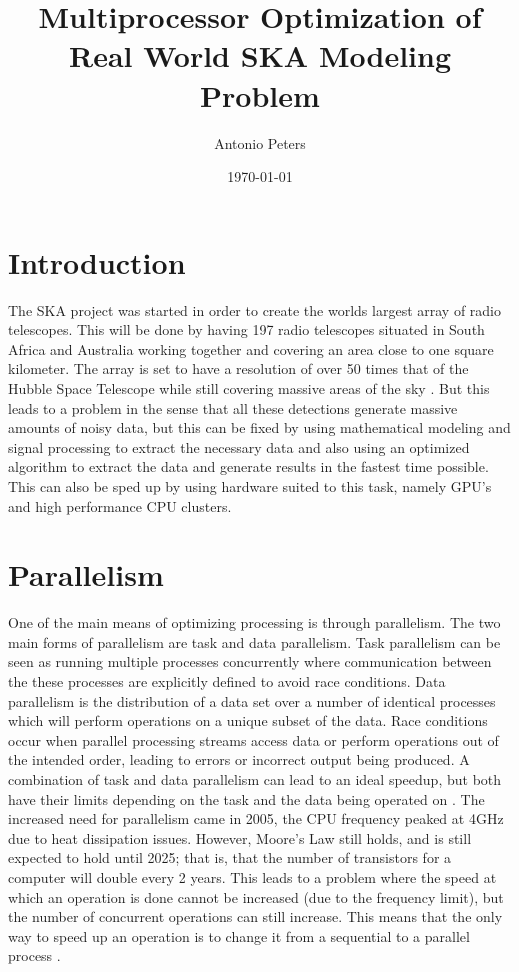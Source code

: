 \documentclass{article}
\title{ Multiprocessor Optimization of Real World SKA Modeling Problem }
\author{Antonio Peters}
\date{\today}
\begin{document}
\maketitle

\section{Introduction}
The SKA project was started in order to create the worlds largest array of radio telescopes. This will be done by having 197 radio telescopes situated in South Africa and Australia working together and covering an area close to one square kilometer. The array is set to have a resolution of over 50 times that of the Hubble Space Telescope while still covering massive areas of the sky \cite{SKAsite}. But this leads to a problem in the sense that all these detections generate massive amounts of noisy data, but this can be fixed by using mathematical modeling and signal processing to extract the necessary data and also using an optimized algorithm to extract the data and generate results in the fastest time possible. This can also be sped up by using hardware suited to this task, namely GPU's and high performance CPU clusters.

\section{Parallelism}
One of the main means of optimizing processing is through parallelism. The two main forms of parallelism are task and data parallelism. Task parallelism can be seen as running multiple processes concurrently where communication between the these processes are explicitly defined to avoid race conditions. Data parallelism is the distribution of a data set over a number of identical processes which will perform operations on a unique subset of the data. Race conditions occur when parallel processing streams access data or perform operations out of the intended order, leading to errors or incorrect output being produced. A combination of task and data parallelism can lead to an ideal speedup, but both have their limits depending on the task and the data being operated on \cite{subhlok1993exploiting}.
\linebreak
\linebreak
The increased need for parallelism came in 2005, the CPU frequency peaked at 4GHz due to heat dissipation issues. However, Moore's Law still holds, and is still expected to hold until 2025; that is, that the number of transistors for a computer will double every 2 years. This leads to a problem where the speed at which an operation is done cannot be increased (due to the frequency limit), but the number of concurrent operations can still increase. This means that the only way to speed up an operation is to change it from a sequential to a parallel process \cite{rajan2013informatics}.
\end{document}
